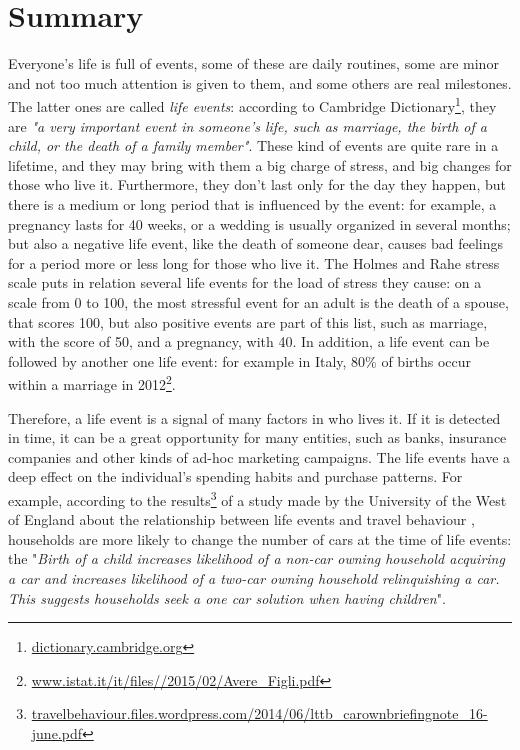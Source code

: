 \chapter*{Summary} %
\label{summary}
Everyone's life is full of events, some of these are daily routines, some are minor and not too much attention is given to them, and some others are real milestones. The latter ones are called \emph{life events}: according to Cambridge Dictionary\footnote{\url{dictionary.cambridge.org}}, they are \textit{"a very important event in someone's life, such as marriage, the birth of a child, or the death of a family member"}. These kind of events are quite rare in a lifetime, and they may bring with them a big charge of stress, and big changes for those who live it. Furthermore, they don't last only for the day they happen, but there is a medium or long period that is influenced by the event: for example, a pregnancy lasts for 40 weeks, or a wedding is usually organized in several months; but also a negative life event, like the death of someone dear, causes bad feelings for a period more or less long for those who live it. The Holmes and Rahe stress scale \cite{holmes1967social} puts in relation several life events for the load of stress they cause: on a scale from 0 to 100, the most stressful event for an adult is the death of a spouse, that scores 100, but also positive events are part of this list, such as marriage, with the score of 50, and a pregnancy, with 40. In addition, a life event can be followed by another one life event: for example in Italy, 80\% of births occur within a marriage in 2012\footnote{\url{www.istat.it/it/files//2015/02/Avere_Figli.pdf}}.

Therefore, a life event is a signal of many factors in who lives it. If it is detected in time, it can be a great opportunity for many entities, such as banks, insurance companies and other kinds of ad-hoc marketing campaigns. The life events have a deep effect on the individual's spending habits and purchase patterns. For example, according to the results\footnote{\url{travelbehaviour.files.wordpress.com/2014/06/lttb_carownbriefingnote_16-june.pdf}} of a study made by the University of the West of England about the relationship between life events and travel behaviour \cite{chatterjee2015facts}, households are more likely to change the number of cars at the time of life events: the "\textit{Birth of a child increases likelihood of a non-car owning household acquiring a car and increases likelihood of a two-car owning household relinquishing a car. This suggests households seek a one car solution when having children}".

